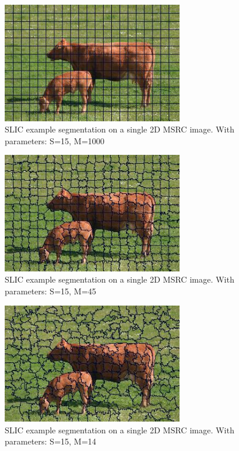 \begin{figure}[H]
  \centering
  \includegraphics[width=0.7\textwidth,natwidth=610,natheight=642]{images/_supPix_2_15_M0_01_seg.jpg}
  \caption{ SLIC example segmentation on a single 2D MSRC image. With parameters:  S=15, M=1000 } 
  \label{fig:showingMonMSRC1}
\end{figure} 
\begin{figure}[H]
  \centering
  \includegraphics[width=0.7\textwidth,natwidth=610,natheight=642]{images/_supPix_2_15_M5_0_seg.jpg}
  \caption{  SLIC example segmentation on a single 2D MSRC image. With parameters:  S=15, M=45 } 
  \label{fig:showingMonMSRC2}
\end{figure} 
\begin{figure}[H]
  \centering
  \includegraphics[width=0.7\textwidth,natwidth=610,natheight=642]{images/_supPix_2_15_M10_0_seg.jpg}
  \caption{  SLIC example segmentation on a single 2D MSRC image. With parameters:  S=15, M=14 } 
  \label{fig:showingMonMSRC3}
\end{figure} 

